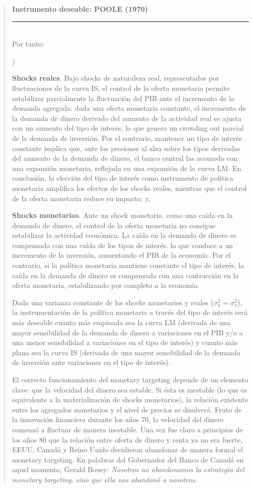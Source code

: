 \documentclass[10pt,a4paper]{article}
\newcounter{alphaitem}
\newenvironment{la}
      {\begin{list}{\alph{alphaitem})}{%
          \usecounter{alphaitem}%
          \setlength{\leftmargin}{1cm}%
          \setlength{\parskip}{3pt}%
          \setlength{\itemsep}{0pt}%
          \setlength{\parsep}{0pt}%
      }}
      {\end{list}}
\newenvironment{specialblock}[1]{%
      \begin{quote} %
      \small %
      \noindent\textbf{#1}\\[-0.3em] %
      \rule{\linewidth}{0.4pt}\\[0.6em]}{
      \end{quote}}
\begin{document}
\begin{specialblock}{Instrumento deseable: POOLE (1970)}
    Por tanto:
    \begin{la}
        \item \textbf{Shocks reales}. Bajo shocks de naturaleza real, representados por fluctuaciones de la curva IS, el control de la oferta monetaria permite estabilizar parcialmente la fluctuación del PIB ante el incremento de la demanda agregada: dada una oferta monetaria constante, el incremento de la demanda de dinero derivado del aumento de la actividad real se ajusta con un aumento del tipo de interés, lo que genera un crowding out parcial de la demanda de inversión. Por el contrario, mantener un tipo de interés constante implica que, ante las presiones al alza sobre los tipos derivadas del aumento de la demanda de dinero, el banco central las acomoda con una expansión monetaria, reflejada en una expansión de la curva LM. En conclusión, la elección del tipo de interés como instrumento de política monetaria amplifica los efectos de los shocks reales, mientras que el control de la oferta monetaria reduce su impacto; y,
        \item \textbf{Shocks monetarios}. Ante un shock monetario, como una caída en la demanda de dinero, el control de la oferta monetaria no consigue estabilizar la actividad económica. La caída en la demanda de dinero es compensada con una caída de los tipos de interés. lo que conduce a un incremento de la inversión, aumentando el PIB de la economía. Por el contrario, si la política monetaria mantiene constante el tipo de interés, la caída en la demanda de dinero es compensada con una contracción en la oferta monetaria, estabilizando por completo a la economía.
    \end{la}

    Dada una varianza constante de los shocks monetarios y reales ($\sigma_u^2=\sigma_v^2$), la instrumentación de la política monetaria a través del tipo de interés será más deseable cuanto más empinada sea la curva LM (derivada de una mayor sensibilidad de la demanda de dinero a variaciones en el PIB y/o a una menor sensibilidad a variaciones en el tipo de interés) y cuanto más plana sea la curva IS (derivada de una mayor sensibilidad de la demanda de inversión ante variaciones en el tipo de interés).

    El correcto funcionamiento del monetary targeting depende de un elemento clave: que la velocidad del dinero sea estable. Si ésta es inestable (lo que es equivalente a la materialización de shocks monetarios), la relación existente entre los agregados monetarios y el nivel de precios se disolverá. Fruto de la innovación financiera durante los años 70, la velocidad del dinero comenzó a fluctuar de manera inestable. Una vez fue claro a principios de los años 80 que la relación entre oferta de dinero y renta ya no era fuerte, EEUU, Canadá y Reino Unido decidieron abandonar de manera formal el monetary targeting. En palabras del Gobernador del Banco de Canadá en aquel momento, Gerald Bouey: \textit{Nosotros no abandonamos la estrategia del monetary targeting, sino que ella nos abandonó a nosotros}.
\end{specialblock}
\end{document}
